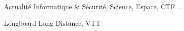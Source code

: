 

\begin{cventries}

  \begin{cvitems} %
    \item {Actualité Informatique \& Sécurité, Science, Espace, CTF...}
    \item {Longboard Long Distance, VTT}
  \end{cvitems}

\end{cventries}
